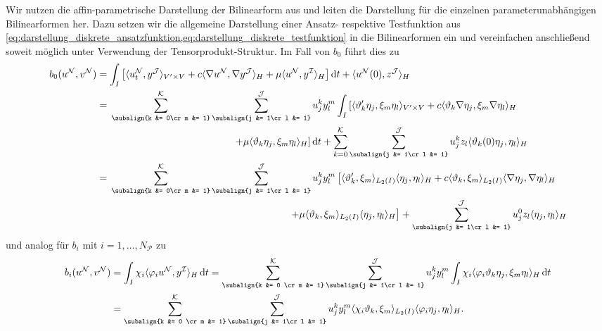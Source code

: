 \documentclass[../main.tex]{subfiles}
\begin{document}
Wir nutzen die affin-parametrische Darstellung der Bilinearform aus und leiten die Darstellung für die einzelnen parameterunabhängigen Bilinearformen her.
Dazu setzen wir die allgemeine Darstellung einer Ansatz- respektive Testfunktion aus \cref{eq:darstellung_diskrete_ansatzfunktion,eq:darstellung_diskrete_testfunktion} in die Bilinearformen ein und vereinfachen anschließend soweit möglich unter Verwendung der Tensorprodukt-Struktur.
Im Fall von $b_{0}$ führt dies zu
\begin{align}
    b_{0}(u^{\mathcal N}, v^{\mathcal N})
    &=
    \int_{I} \left[ \skp{u^{\mathcal N}_{t}}{y^{\mathcal J}}{V' \times V} + c \skp{\grad u^{\mathcal N}}{\grad y^{\mathcal J}}{H} + \mu \skp{u^{\mathcal N}}{y^{\mathcal I}}{H} \right] \diff t + \skp{u^{\mathcal N}(0)}{z^{\mathcal J}}{H}
    \\&= \begin{multlined}[t][.8\displaywidth]
    \sum_{\subalign{k &= 0\cr m &= 1}}^{\mathcal K} \sum_{\subalign{j &= 1\cr l &= 1}}^{\mathcal J} u^{k}_{j} y^{m}_{l}
    \int_{I} \left[ \skp{\theta_{k}' \eta_{j}}{\xi_{m} \eta_{l}}{V' \times V} + c \skp{\theta_{k} \grad \eta_{j}}{\xi_{m} \grad \eta_{l}}{H} \right.
    \\ \left.+ \mu \skp{\theta_{k} \eta_{j}}{\xi_{m} \eta_{l}}{H} \right] \diff t
    + \sum_{k = 0}^{\mathcal K} \sum_{\subalign{j &= 1\cr l &= 1}}^{\mathcal J} u^{k}_{j} z_{l} \skp{\theta_{k}(0) \eta_{j}}{\eta_{l}}{H}
    \end{multlined}
    \\&=\begin{multlined}[t][.8\displaywidth]
    \sum_{\subalign{k &= 0\cr m &= 1}}^{\mathcal K} \sum_{\subalign{j &= 1\cr l &= 1}}^{\mathcal J} u^{k}_{j} y^{m}_{l} \left[ \skp{\theta_{k}'}{\xi_{m}}{L_{2}(I)} \skp{\eta_{j}}{\eta_{l}}{H} + c \skp{\theta_{k}}{\xi_{m}}{L_{2}(I)}\skp{\grad \eta_{j}}{\grad \eta_{l}}{H} \right.
    \\\left. + \mu \skp{\theta_{k}}{\xi_{m}}{L_{2}(I)} \skp{\eta_{j}}{\eta_{l}}{H} \right] + \sum_{\subalign{j &= 1\cr l &= 1}}^{\mathcal J} u^{0}_{j}  z_{l} \skp{\eta_{j}}{\eta_{l}}{H}
    \end{multlined}
\end{align}
und analog für $b_{i}$ mit $i = 1, \dots, N_{\mathcal P}$ zu
\begin{align}
    b_{i}(u^{\mathcal N}, v^{\mathcal N})
    &= \int_{I} \chi_{i} \skp{\varphi_{i} u^{\mathcal N}}{y^{\mathcal I}}{H} \diff t
    = \sum_{\subalign{k &= 0 \cr m &= 1}}^{\mathcal K} \sum_{\subalign{j &= 1\cr l &= 1}}^{\mathcal J} u^{k}_{j} y^{m}_{l} \int_{I} \chi_{i} \skp{\varphi_{i} \theta_{k} \eta_{j}}{\xi_{m} \eta_{l}}{H} \diff t
    \\&= \sum_{\subalign{k &= 0 \cr m &= 1}}^{\mathcal K} \sum_{\subalign{j &= 1\cr l &= 1}}^{\mathcal J} u^{k}_{j} y^{m}_{l} \skp{\chi_{i} \theta_{k}}{\xi_{m}}{L_{2}(I)} \skp{\varphi_{i} \eta_{j}}{\eta_{l}}{H}.
\end{align}
\end{document}
